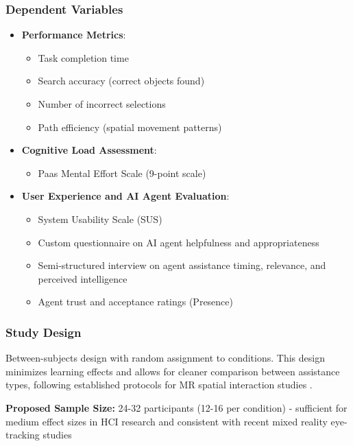 \documentclass[12pt,letterpaper]{article}
\begin{document}
\subsubsection{Dependent Variables}
\begin{itemize}
    \item \textbf{Performance Metrics}:
    \begin{itemize}
        \item Task completion time
        \item Search accuracy (correct objects found)
        \item Number of incorrect selections
        \item Path efficiency (spatial movement patterns)
    \end{itemize}
    
    \item \textbf{Cognitive Load Assessment}:
    \begin{itemize}
        \item Paas Mental Effort Scale (9-point scale)\citep{augereau2022open}
 \end{itemize}
    
    \item \textbf{User Experience and AI Agent Evaluation}:
    \begin{itemize}
        \item System Usability Scale (SUS)
        \item Custom questionnaire on AI agent helpfulness and appropriateness
        \item Semi-structured interview on agent assistance timing, relevance, and perceived intelligence
        \item Agent trust and acceptance ratings (Presence)
    \end{itemize}
\end{itemize}

\subsubsection{Study Design}
Between-subjects design with random assignment to conditions. This design minimizes learning effects and allows for cleaner comparison between assistance types, following established protocols for MR spatial interaction studies \citep{chiossi2024searching}.

\textbf{Proposed Sample Size:} 24-32 participants (12-16 per condition) - sufficient for medium effect sizes in HCI research and consistent with recent mixed reality eye-tracking studies
\end{document}
